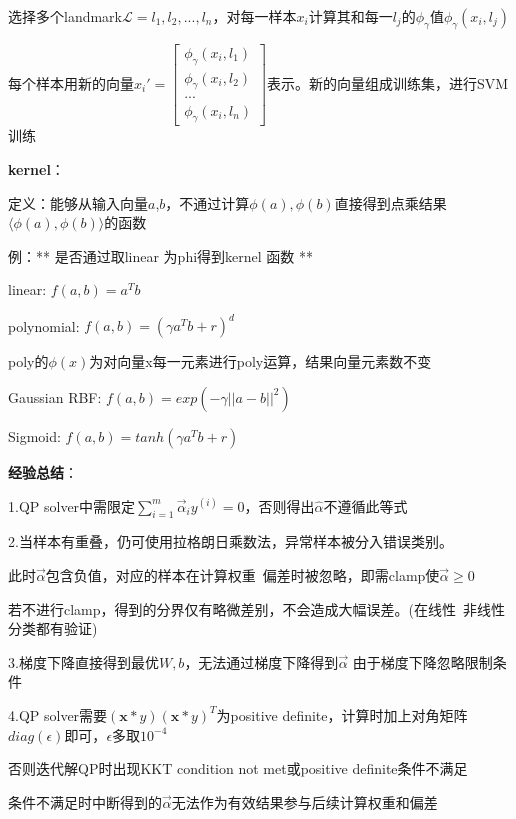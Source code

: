 \documentclass[UTF8]{ctexart}
\begin{document}
  \quad 选择多个landmark$\mathcal{L} = l_1, l_2, ..., l_n$，对每一样本$x_i$计算其和每一$l_j$的$\phi_{\gamma}$值$\phi_{\gamma}(x_i, l_j)$

  \quad 每个样本用新的向量$x_i' = \begin{bmatrix}
    \phi_{\gamma}(x_i, l_1) \\
    \phi_{\gamma}(x_i, l_2) \\
    ... \\
    \phi_{\gamma}(x_i, l_n)
  \end{bmatrix}$表示。新的向量组成训练集，进行SVM训练

  \textbf{kernel}：

  \quad 定义：能够从输入向量$a$,$b$，不通过计算$\phi(a), \phi(b)$直接得到点乘结果$\langle \phi (a), \phi (b)\rangle $的函数

  \quad 例：** 是否通过取linear 为phi得到kernel 函数 **

  \quad \quad linear: $f(a, b) = a^Tb$

  \quad \quad polynomial: $f(a, b) = (\gamma a^Tb+r)^d$

  \quad \quad \quad poly的$\phi(x)$为对向量x每一元素进行poly运算，结果向量元素数不变

  \quad \quad Gaussian RBF: $f(a, b) = exp(-\gamma ||a-b||^2)$

  \quad \quad Sigmoid: $f(a, b) = tanh(\gamma a^Tb + r)$

  \quad \textbf{经验总结}：

  \quad \quad 1.QP solver中需限定$\sum_{i=1}^{m}\vec{\alpha}_iy^{(i)}=0$，否则得出$\hat{\alpha}$不遵循此等式

  \quad \quad 2.当样本有重叠，仍可使用拉格朗日乘数法，异常样本被分入错误类别。

  \quad \quad \quad 此时$\vec{\alpha}$包含负值，对应的样本在计算权重\ 偏差时被忽略，即需clamp使$\vec{\alpha} \geq 0$

  \quad \quad \quad 若不进行clamp，得到的分界仅有略微差别，不会造成大幅误差。(在线性\ 非线性分类都有验证)

  \quad \quad 3.梯度下降直接得到最优$W, b$，无法通过梯度下降得到$\vec{\alpha}$ 由于梯度下降忽略限制条件

  \quad \quad 4.QP solver需要$(\textbf{x} * y)(\textbf{x} * y)^T$为positive definite，计算时加上对角矩阵$diag(\epsilon)$即可，$\epsilon$多取$10^{-4}$

  \quad \quad \quad 否则迭代解QP时出现KKT condition not met或positive definite条件不满足

  \quad \quad \quad 条件不满足时中断得到的$\vec{\alpha}$无法作为有效结果参与后续计算权重和偏差
\end{document}
